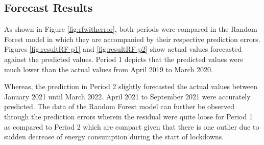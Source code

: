 \documentclass[runningheads]{llncs}
\begin{document}
\subsection{Forecast Results}
As shown in Figure \ref{fig:rfwitherror}, both periods were compared in the Random Forest model in which they are accompanied by their respective prediction errors. Figures \ref{fig:resultRF-p1} and \ref{fig:resultRF-p2} show actual values forecasted against the predicted values. Period 1 depicts that the predicted values were much lower than the actual values from April 2019 to March 2020. 

Whereas, the prediction in Period 2 slightly forecasted the actual values between January 2021 until March 2022. April 2021 to September 2021 were accurately predicted. The data of the Random Forest model can further be observed through the prediction errors wherein the residual were quite loose for Period 1 as compared to Period 2 which are compact given that there is one outlier due to sudden decrease of energy consumption during the start of lockdowns.
\end{document}
